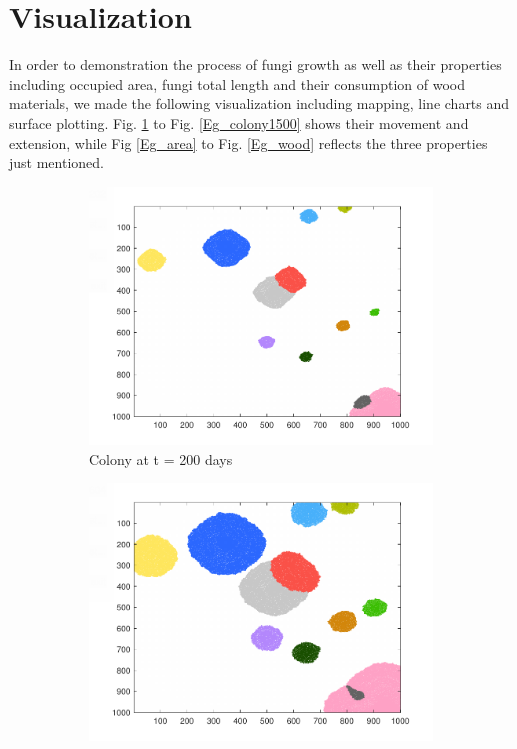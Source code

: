 \documentclass[a4paper,12pt]{article}
\begin{document}
\section{Visualization}
In order to demonstration the process of fungi growth as well as their properties including occupied area, fungi total length and their consumption of wood materials, we made the following visualization including mapping, line charts and surface plotting. Fig. \ref{Eg_colony200} to Fig. \ref{Eg_colony1500} shows their movement and extension, while Fig \ref{Eg_area} to Fig. \ref{Eg_wood} reflects the three properties just mentioned.

\begin{figure}[H]
	\centering
	\begin{subfigure}{0.3\textwidth}
		\includegraphics[width=\textwidth]{./picture/Eg_200day.pdf}
		\caption{Colony at t = 200 days}
		\label{Eg_colony200}
	\end{subfigure}
	\begin{subfigure}{0.3\textwidth}
		\includegraphics[width=\textwidth]{./picture/Eg_600day.pdf}

\end{subfigure}
\end{figure}
\end{document}
